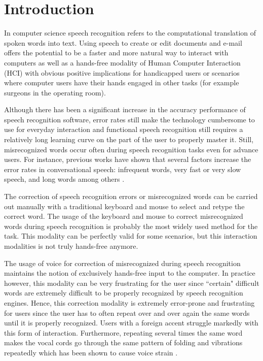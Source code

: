 \documentclass[]{article}
\begin{document}
\section{Introduction}
In computer science speech recognition refers to the computational translation of spoken words into text.
Using speech to create or edit documents and e-mail offers the potential to be a faster and more natural way to interact
with computers as well as a hands-free modality of Human Computer Interaction (HCI) with obvious positive implications
for handicapped users or scenarios where computer users have their hands engaged in other tasks (for example surgeons in
the operating room).


Although there has been a significant increase in the accuracy performance of speech recognition software, error
rates still make the technology cumbersome to use for everyday interaction and functional speech recognition still
requires a relatively long learning curve on the part of the user to properly master it. Still, misrecognized words
occur often during speech recognition tasks even for advance users. For instance, previous works have shown that
several factors increase the error rates in conversational speech: infrequent words, very fast or very slow speech, and
long words among others \cite{Goldwater2010181}.


The correction of speech recognition errors or misrecognized words can be carried out manually with a traditional
keyboard and mouse to select and retype the correct word. The usage  of the keyboard and mouse to correct misrecognized
words  during speech recognition is probably the most widely used method for the task. This modality can be
perfectly valid for some scenarios, but this interaction modalities is not truly hands-free anymore.


The usage of voice for correction of misrecognized during speech recognition maintains the notion of exclusively
hands-free input to the computer. In practice however, this modality can be very frustrating for the user since
``certain" difficult words are extremely difficult to be properly recognized by speech recognition engines. Hence, this
correction modality is extremely error-prone and frustrating for users since the user has to often repeat over and over
again the same words until it is properly recognized. Users with a foreign accent struggle markedly with this form of
interaction. Furthermore, repeating several times the same word makes the vocal cords go through the same pattern of
folding and vibrations repeatedly which has been shown to cause voice strain \cite{voiceproblems}.
\end{document}
